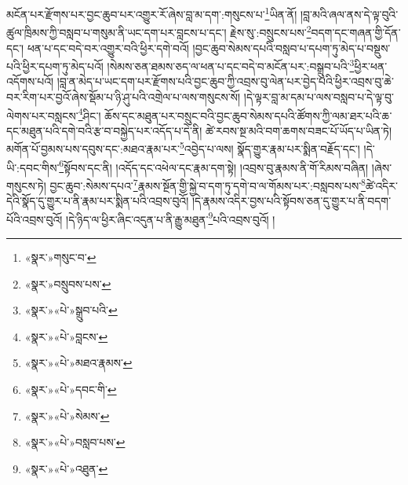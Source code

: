 མངོན་པར་རྫོགས་པར་བྱང་ཆུབ་པར་འགྱུར་རོ་ཞེས་བླ་མ་དག་:གསུངས་པ་\footnote{«སྣར་»གསུང་བ་}ཡིན་ནོ། །བླ་མའི་ཞལ་ནས་དེ་ལྟ་བུའི་ཚུལ་ཁྲིམས་ཀྱི་བསླབ་པ་གསུམ་ནི་ཡང་དག་པར་བླངས་པ་དང་། རྗེས་སུ་:བསྲུངས་པས་\footnote{«སྣར་»བསྲུབས་པས་}བདག་དང་གཞན་གྱི་དོན་དང་། ཕན་པ་དང་བདེ་བར་འགྱུར་བའི་ཕྱིར་དགེ་བའོ། །བྱང་ཆུབ་སེམས་དཔའི་བསླབ་པ་དཔག་ཏུ་མེད་པ་བསྡུས་པའི་ཕྱིར་དཔག་ཏུ་མེད་པའོ། །སེམས་ཅན་ཐམས་ཅད་ལ་ཕན་པ་དང་བདེ་བ་མངོན་པར་:བསྒྲུབ་པའི་\footnote{«སྣར་»«པེ་»སྒྲུབ་པའི་}ཕྱིར་ཕན་འདོགས་པའོ། །བླ་ན་མེད་པ་ཡང་དག་པར་རྫོགས་པའི་བྱང་ཆུབ་ཀྱི་འབྲས་བུ་ལེན་པར་བྱེད་པའི་ཕྱིར་འབྲས་བུ་ཆེ་བར་རིག་པར་བྱའོ་ཞེས་སྡོམ་པ་ཉི་ཤུ་པའི་འགྲེལ་པ་ལས་གསུངས་སོ། །དེ་ལྟར་བླ་མ་དམ་པ་ལས་བསླབ་པ་དེ་ལྟ་བུ་ལེགས་པར་བསླངས་\footnote{«སྣར་»«པེ་»བླངས་}ཤིང་། ཆོས་དང་མཐུན་པར་བསྲུང་བའི་བྱང་ཆུབ་སེམས་དཔའི་ཚོགས་ཀྱི་ལམ་ཐར་པའི་ཆ་དང་མཐུན་པའི་དགེ་བའི་རྩ་བ་བསྐྱེད་པར་འདོད་པ་དེ་ནི། ཚེ་རབས་སྔ་མའི་བག་ཆགས་བཟང་པོ་ཡོད་པ་ཡིན་ཏེ། མགོན་པོ་བྱམས་པས་དབུས་དང་:མཐའ་རྣམ་པར་\footnote{«སྣར་»«པེ་»མཐའ་རྣམས་}འབྱེད་པ་ལས། སྣོད་གྱུར་རྣམ་པར་སྨིན་བརྗོད་དང་། །དེ་ཡི་:དབང་གིས་\footnote{«སྣར་»«པེ་»དབང་གི་}སྟོབས་དང་ནི། །འདོད་དང་འཕེལ་དང་རྣམ་དག་སྟེ། །འབྲས་བུ་རྣམས་ནི་གོ་རིམས་བཞིན། །ཞེས་གསུངས་ཏེ། བྱང་ཆུབ་:སེམས་དཔའ་\footnote{«སྣར་»«པེ་»སེམས་}རྣམས་སྔོན་གྱི་སྐྱེ་བ་དག་ཏུ་དགེ་བ་ལ་གོམས་པར་:བསླབས་པས་\footnote{«སྣར་»«པེ་»བསླབ་པས་}ཚེ་འདིར་དེའི་སྣོད་དུ་གྱུར་པ་ནི་རྣམ་པར་སྨིན་པའི་འབྲས་བུའོ། །དེ་རྣམས་འདིར་བྱས་པའི་སྟོབས་ཅན་དུ་གྱུར་པ་ནི་བདག་པོའི་འབྲས་བུའོ། །དེ་ཉིད་ལ་ཕྱིར་ཞིང་འདུན་པ་ནི་རྒྱུ་མཐུན་\footnote{«སྣར་»«པེ་»འཐུན་}པའི་འབྲས་བུའོ། །

